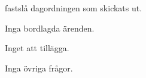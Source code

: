 \documentclass{protokoll}
\date{2019-10-07}  %
\begin{document}
\newpage  


\begin{beslut}
     \att fastslå dagordningen som skickats ut.
\end{beslut}

Inga bordlagda ärenden.

Inget att tillägga.


Inga övriga frågor.
\end{document}

